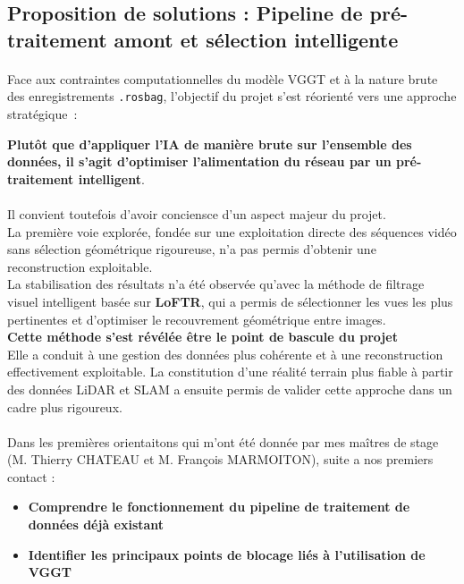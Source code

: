 \documentclass[12pt,a4paper,oneside]{report}
\begin{document}
\begingroup
\subsection{Proposition de solutions : Pipeline de pré-traitement amont et sélection intelligente}
\label{subsec:solutions_pipeline}

\setlength{\parskip}{0.7em}
\setlength{\parindent}{0pt}
\linespread{1.08}\selectfont

\paragraph{}
 Face aux contraintes computationnelles du modèle VGGT et à la nature brute des enregistrements \texttt{.rosbag}, l'objectif du projet s'est réorienté vers une approche stratégique~:

\textbf{Plutôt que d'appliquer l'IA de manière brute sur l'ensemble des données, il s'agit d'optimiser l'alimentation du réseau par un pré-traitement intelligent}.
\paragraph{}
\vspace{-\baselineskip} Il convient toutefois d'avoir conciensce d'un aspect majeur du projet. \\
La première voie explorée, fondée sur une exploitation directe des séquences vidéo sans sélection géométrique rigoureuse, n'a pas permis d'obtenir une reconstruction exploitable.\\
\hspace*{0.3cm} La stabilisation des résultats n'a été observée qu'avec la méthode de filtrage visuel intelligent basée sur \textbf{LoFTR}, qui a permis de sélectionner les vues les plus pertinentes et d'optimiser le recouvrement géométrique entre images. \\
\hspace*{0.3cm} \textbf{Cette méthode s'est révélée être le point de bascule du projet}\\
\hspace*{1cm} Elle a conduit à une gestion des données plus cohérente et à une reconstruction effectivement exploitable. La constitution d'une réalité terrain plus fiable à partir des données LiDAR et SLAM a ensuite permis de valider cette approche dans un cadre plus rigoureux.
\paragraph{}
 Dans les premières orientaitons qui m'ont été donnée par mes maîtres de stage (M. Thierry CHATEAU et M. François MARMOITON), suite a nos premiers contact :
\begin{itemize}[label=\textbf{\textendash}]
	\item \textbf{Comprendre le fonctionnement du pipeline de traitement de données déjà existant}
	\item \textbf{Identifier les principaux points de blocage liés à l'utilisation de VGGT}
\end{itemize}
\end{document}
